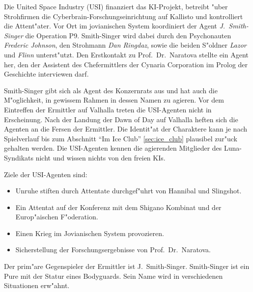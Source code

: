 
Die United Space Industry (USI) finanziert das KI-Projekt, betreibt "uber Strohfirmen die Cyberbrain-Forschungseinrichtung auf Kallisto und kontrolliert die Attent"ater. Vor Ort im jovianischen System koordiniert der Agent \emph{J.~Smith-Singer} die Operation P9. Smith-Singer wird dabei durch den Psychonauten \emph{Frederic Johnson}, den Strohmann \emph{Dan Ringdaz}, sowie die beiden S"oldner \emph{Lazor} und \emph{Flinn} unterst"utzt. Den Erstkontakt zu Prof.~Dr.~Naratova stellte ein Agent her, den der Assistent des Chefermittlers der Cynaria Corporation im Prolog der Geschichte interviewen darf.

Smith-Singer gibt sich als Agent des Konzernrats aus und hat auch die M"oglichkeit, in gewissem Rahmen in dessen Namen zu agieren. Vor dem Eintreffen der Ermittler auf Valhalla treten die USI-Agenten nicht in Erscheinung. Nach der Landung der Dawn of Day auf Valhalla heften sich die Agenten an die Fersen der Ermittler. Die Identit"at der Charaktere kann je nach Spielverlauf bis zum Abschnitt  ``Im Ice Club'' \cref{sec:ice_club} plausibel zur"uck gehalten werden. Die USI-Agenten kennen die agierenden Mitglieder des Luna-Syndikats nicht und wissen nichts von den freien KIs.

Ziele der USI-Agenten sind:

\begin{itemize}
    \item Unruhe stiften durch Attentate durchgef"uhrt von Hannibal und Slingshot.
    \item Ein Attentat auf der Konferenz mit dem Shigano Kombinat und der Europ"aischen F"oderation.
    \item Einen Krieg im Jovianischen System provozieren.
    \item Sicherstellung der Forschungsergebnisse von  Prof.~Dr.~Naratova.
\end{itemize}

Der prim"are Gegenspieler der Ermittler ist J.~Smith-Singer. Smith-Singer ist ein Pure mit der Statur eines Bodyguards. Sein Name wird in verschiedenen Situationen erw"ahnt.

